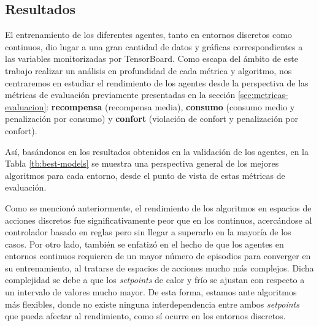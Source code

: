 \FloatBarrier
\subsection{Resultados}
\label{sec:results}

El entrenamiento de los diferentes agentes, tanto en entornos discretos como continuos, dio lugar a una gran cantidad de datos y gráficas correspondientes a las variables monitorizadas por TensorBoard. Como escapa del ámbito de este trabajo realizar un análisis en profundidad de cada métrica y algoritmo, nos centraremos en estudiar el rendimiento de los agentes desde la perspectiva de las métricas de evaluación previamente presentadas en la sección \ref{sec:metricas-evaluacion}: \textbf{recompensa} (recompensa media), \textbf{consumo} (consumo medio y penalización por consumo) y \textbf{confort} (violación de confort y penalización por confort). 

Así, basándonos en los resultados obtenidos en la validación de los agentes, en la Tabla \ref{tb:best-models} se muestra una perspectiva general de los mejores algoritmos para cada entorno, desde el punto de vista de estas métricas de evaluación.

\begin{table}
    \centering
    \caption{Mejores agentes para diferentes entornos y métricas}
    \label{tb:best-models}
\end{table}

Como se mencionó anteriormente, el rendimiento de los algoritmos en espacios de acciones discretos fue significativamente peor que en los continuos, acercándose al controlador basado en reglas pero sin llegar a superarlo en la mayoría de los casos. Por otro lado, también se enfatizó en el hecho de que los agentes en entornos continuos requieren de un mayor número de episodios para converger en su entrenamiento, al tratarse de espacios de acciones mucho más complejos. Dicha complejidad se debe a que los \textit{setpoints} de calor y frío se ajustan con respecto a un intervalo de valores mucho mayor. De esta forma, estamos ante algoritmos más flexibles, donde no existe ninguna interdependencia entre ambos \textit{setpoints} que pueda afectar al rendimiento, como sí ocurre en los entornos discretos.

